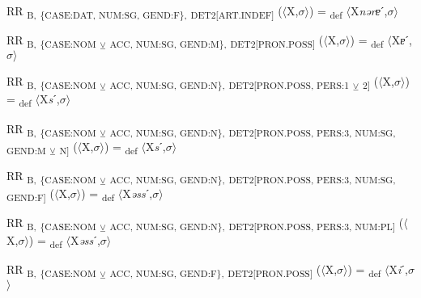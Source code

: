 {\begin{exe}
 RR \textsubscript{B,} \textsubscript{\{CASE:DAT, NUM:SG, GEND:F\},} \textsubscript{DET2[ART.INDEF]} ($\langle$X,$\sigma $$\rangle$) = \textsubscript{def} $\langle$X\textit{nərɐ}ˊ,$\sigma $$\rangle$
\end{exe}

\begin{exe}
 RR \textsubscript{B,} \textsubscript{\{CASE:NOM} \textsubscript{${\veebar}$}\textsubscript{ ACC, NUM:SG, GEND:M\},} \textsubscript{DET2[PRON.POSS]} ($\langle$X,$\sigma $$\rangle$) = \textsubscript{def} $\langle$X\textit{ɐ}ˊ,$\sigma $$\rangle$
\end{exe}

\begin{exe}
 RR \textsubscript{B,} \textsubscript{\{CASE:NOM} \textsubscript{${\veebar}$}\textsubscript{ ACC, NUM:SG, GEND:N\},} \textsubscript{DET2[PRON.POSS, PERS:1} \textsubscript{${\veebar}$}\textsubscript{ 2]} ($\langle$X,$\sigma $$\rangle$) = \textsubscript{def} $\langle$X\textit{s}ˊ,$\sigma $$\rangle$
\end{exe}

\begin{exe}
 RR \textsubscript{B,} \textsubscript{\{CASE:NOM} \textsubscript{${\veebar}$}\textsubscript{ ACC, NUM:SG, GEND:N\},} \textsubscript{DET2[PRON.POSS, PERS:3, NUM:SG, GEND:M} \textsubscript{${\veebar}$}\textsubscript{ N]} ($\langle$X,$\sigma $$\rangle$) = \textsubscript{def} $\langle$X\textit{s}ˊ,$\sigma $$\rangle$
\end{exe}

\begin{exe}
 RR \textsubscript{B,} \textsubscript{\{CASE:NOM} \textsubscript{${\veebar}$}\textsubscript{ ACC, NUM:SG, GEND:N\},} \textsubscript{DET2[PRON.POSS, PERS:3, NUM:SG, GEND:F]} ($\langle$X,$\sigma $$\rangle$) = \textsubscript{def} $\langle$X\textit{əss}ˊ,$\sigma $$\rangle$
\end{exe}

\begin{exe}
 RR \textsubscript{B,} \textsubscript{\{CASE:NOM} \textsubscript{${\veebar}$}\textsubscript{ ACC, NUM:SG, GEND:N\},} \textsubscript{DET2[PRON.POSS, PERS:3, NUM:PL]} ($\langle$X,$\sigma $$\rangle$) = \textsubscript{def} $\langle$X\textit{əss}ˊ,$\sigma $$\rangle$
\end{exe}

\begin{exe}
 RR \textsubscript{B,} \textsubscript{\{CASE:NOM} \textsubscript{${\veebar}$}\textsubscript{ ACC, NUM:SG, GEND:F\},} \textsubscript{DET2[PRON.POSS]} ($\langle$X,$\sigma $$\rangle$) = \textsubscript{def} $\langle$X\textit{i}ˊ,$\sigma $$\rangle$
\end{exe}

}
